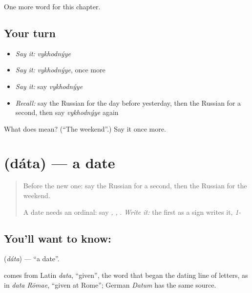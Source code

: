 \begin{grammarlens}[title={What you've built}]
One more word for this chapter.
\end{grammarlens}

\subsection*{Your turn}
\begin{itemize}
\raggedright
  \item \emph{Say it:} \emph{vykhodnýye}
  \item \emph{Say it:} \emph{vykhodnýye}, once more
  \item \emph{Say it:} say \emph{vykhodnýye}
  \item \emph{Recall:} say the Russian for the day before yesterday, then the Russian for a second, then say \emph{vykhodnýye} again
\end{itemize}

\begin{tcolorbox}[breakable,colback=teal!4,colframe=teal!35!black,title={Before you move on}]
What does  mean? (\textquotedblleft{}The weekend\textquotedblright{}.) Say it once more.
\end{tcolorbox}
\section[\texorpdfstring{\ru{дата} (dáta)}{дата (dáta)}]{ (dáta) — a date}

\label{lesson:RU-C85-date}



\begin{quote}
Before the new one: say the Russian for a second, then the Russian for the weekend.

A date needs an ordinal: say \emph{, , }. \emph{Write it:} the first as a sign writes it, \emph{1-}
\end{quote}

\subsection*{You'll want to know: }
\textbf{} (\emph{dáta}) — \textquotedblleft{}a date\textquotedblright{}.

\begin{cousinweb}
\textbf{} comes from Latin \emph{data}, \textquotedblleft{}given\textquotedblright{}, the word that began the dating line of letters, as in \emph{data Rōmae}, \textquotedblleft{}given at Rome\textquotedblright{}; German \emph{Datum} has the same source.
\end{cousinweb}

